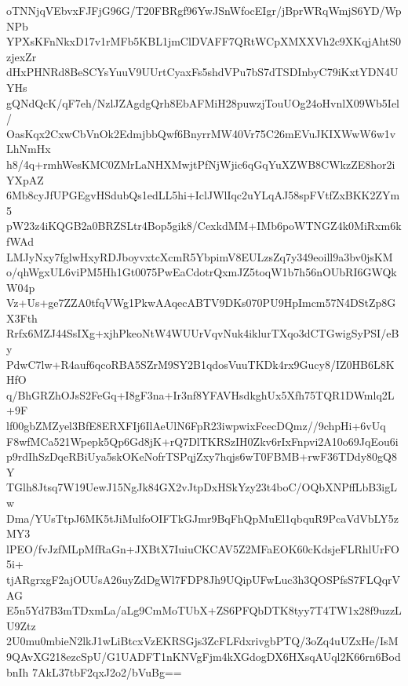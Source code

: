 oTNNjqVEbvxFJFjG96G/T20FBRgf96YwJSnWfocEIgr/jBprWRqWmjS6YD/WpNPb
YPXsKFnNkxD17v1rMFb5KBL1jmClDVAFF7QRtWCpXMXXVh2c9XKqjAhtS0zjexZr
dHxPHNRd8BeSCYsYuuV9UUrtCyaxFs5shdVPu7bS7dTSDInbyC79iKxtYDN4UYHs
gQNdQcK/qF7eh/NzlJZAgdgQrh8EbAFMiH28puwzjTouUOg24oHvnlX09Wb5Iel/
OasKqx2CxwCbVnOk2EdmjbbQwf6BnyrrMW40Vr75C26mEVuJKIXWwW6w1vLhNmHx
h8/4q+rmhWesKMC0ZMrLaNHXMwjtPfNjWjic6qGqYuXZWB8CWkzZE8hor2iYXpAZ
6Mb8cyJfUPGEgvHSdubQs1edLL5hi+IclJWlIqc2uYLqAJ58spFVtfZxBKK2ZYm5
pW23z4iKQGB2a0BRZSLtr4Bop5gik8/CexkdMM+IMb6poWTNGZ4k0MiRxm6kfWAd
LMJyNxy7fglwHxyRDJboyvxtcXcmR5YbpimV8EULzsZq7y349eoill9a3bv0jsKM
o/qhWgxUL6viPM5Hh1Gt0075PwEaCdotrQxmJZ5toqW1b7h56nOUbRI6GWQkW04p
Vz+Us+ge7ZZA0tfqVWg1PkwAAqecABTV9DKs070PU9HpImcm57N4DStZp8GX3Fth
Rrfx6MZJ44SsIXg+xjhPkeoNtW4WUUrVqvNuk4iklurTXqo3dCTGwigSyPSI/eBy
PdwC7lw+R4auf6qcoRBA5SZrM9SY2B1qdosVuuTKDk4rx9Gucy8/IZ0HB6L8KHfO
q/BhGRZhOJsS2FeGq+I8gF3na+Ir3nf8YFAVHsdkghUx5Xfh75TQR1DWmlq2L+9F
lf00gbZMZyel3BfE8ERXFIj6IlAeUlN6FpR23iwpwixFcecDQmz//9chpHi+6vUq
F8wfMCa521Wpepk5Qp6Gd8jK+rQ7DlTKRSzIH0Zkv6rIxFnpvi2A10o69JqEou6i
p9rdIhSzDqeRBiUya5skOKeNofrTSPqjZxy7hqjs6wT0FBMB+rwF36TDdy80gQ8Y
TGlh8Jtsq7W19UewJ15NgJk84GX2vJtpDxHSkYzy23t4boC/OQbXNPffLbB3igLw
Dma/YUsTtpJ6MK5tJiMulfoOIFTkGJmr9BqFhQpMuEl1qbquR9PcaVdVbLY5zMY3
lPEO/fvJzfMLpMfRaGn+JXBtX7IuiuCKCAV5Z2MFaEOK60cKdsjeFLRhlUrFO5i+
tjARgrxgF2ajOUUsA26uyZdDgWl7FDP8Jh9UQipUFwLuc3h3QOSPfsS7FLQqrVAG
E5n5Yd7B3mTDxmLa/aLg9CmMoTUbX+ZS6PFQbDTK8tyy7T4TW1x28f9uzzLU9Ztz
2U0mu0mbieN2lkJ1wLiBtcxVzEKRSGjs3ZcFLFdxrivgbPTQ/3oZq4uUZxHe/IsM
9QAvXG218ezcSpU/G1UADFT1nKNVgFjm4kXGdogDX6HXsqAUql2K66rn6BodbnIh
7AkL37tbF2qxJ2o2/bVuBg==
